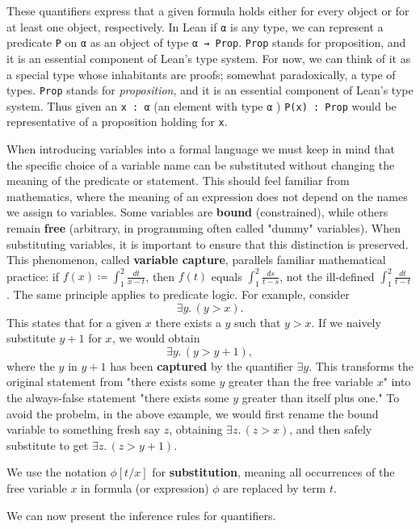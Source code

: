 These quantifiers express that a given formula holds either for every object 
or for at least one object, respectively.
In Lean if \lstinline[language=lean]|α| is any type, we can represent a 
predicate \lstinline[language=lean]|P| on \lstinline[language=lean]|α| as 
an object of type \lstinline[language=lean]|α → Prop|.
\lstinline[language=lean]|Prop| stands for proposition, and it is an 
essential component of Lean’s type system.
For now, we can think of it as a special type whose 
inhabitants are proofs; somewhat 
paradoxically, a type of types. 
\lstinline|Prop| stands for \emph{proposition}, and it is an essential component of Lean’s type system.
Thus given an \lstinline[language=lean]|x : α| (an element
with type \lstinline[language=lean]|α| ) 
\lstinline[language=lean]|P(x) : Prop| would be representative of a proposition holding for \lstinline[language=lean]|x|.

When introducing variables into a formal language we must keep in mind that the specific choice 
of a variable name can be substituted without 
changing the meaning of the predicate or statement. This should feel familiar from mathematics, 
where the meaning of an expression does not depend on the names we assign to variables.
Some variables are \textbf{bound} (constrained), while others remain \textbf{free} 
(arbitrary, in programming often called "dummy" variables). 
When substituting variables, it is important to ensure that this distinction is preserved.
This phenomenon, called \textbf{variable capture}, parallels familiar mathematical practice: 
if $f(x) \coloneqq \int_1^2 \frac{dt}{x-t}$, then $f(t)$ equals $\int_1^2 \frac{ds}{t-s}$, 
not the ill-defined $\int_1^2 \frac{dt}{t-t}$. The same principle applies to predicate logic. For example, consider
\[
\exists y.\,(y > x).
\]
This states that for a given $x$ there exists a $y$ such that $y > x$. 
If we naively substitute $y+1$ for $x$, we would obtain
\[
\exists y.\,(y > y+1),
\]
where the $y$ in $y+1$ has been \textbf{captured} by the quantifier $\exists y$. 
This transforms the original statement from "there exists some $y$ greater than the free variable $x$" into the always-false statement 
"there exists some $y$ greater than itself plus one."
To avoid the probelm, in the above example, we would first rename the bound variable to something fresh 
say $z$, obtaining $\exists z.\,(z > x)$, and then safely substitute to get $\exists z.\,(z > y+1)$.
\begin{notation}
  We use the notation $\phi[t/x]$ for \textbf{substitution}, meaning all occurrences of the free 
  variable $x$ in formula (or expression) $\phi$ are replaced by term $t$.
\end{notation}
We can now present the inference rules for quantifiers.
